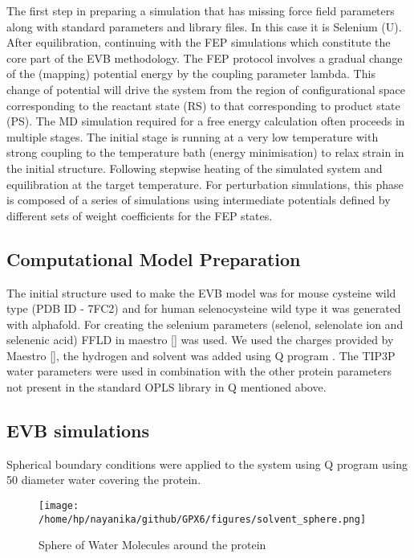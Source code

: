 \documentclass{article}
\begin{document}
The first step in preparing a simulation that has missing force field parameters along with standard parameters and library files. In this case it is Selenium (U). After equilibration, continuing with the FEP simulations which constitute the core part of the EVB methodology. The FEP protocol involves a gradual change of the (mapping) potential energy by the coupling parameter lambda. This change of potential will drive the system from the region of configurational space corresponding to the reactant state (RS) to that corresponding to product state (PS). The MD simulation required for a free energy calculation often proceeds in multiple stages. The initial stage is running at a very low temperature with strong coupling to the temperature bath (energy minimisation) to relax strain in the initial structure. Following stepwise heating of the simulated system and equilibration at the target temperature. For perturbation simulations, this phase is composed of a series of simulations using intermediate potentials defined by different sets of weight coefficients for the FEP states.

\subsection{Computational Model Preparation}

The initial structure used to make the EVB model was for mouse cysteine wild type (PDB ID - 7FC2) and for human selenocysteine wild type it was generated with alphafold. For creating the selenium parameters (selenol, selenolate ion and selenenic acid) FFLD in maestro [] was used. We used the charges provided by Maestro [], the hydrogen and solvent was added using Q program \cite{Marelius1999}. The TIP3P water parameters were used in combination with the other protein parameters not present in the standard OPLS library in Q mentioned above.

\subsection {EVB simulations}

Spherical boundary conditions \cite{King1989} were applied to the system using Q program \cite{Marelius1999} using 50 \text{\AA} diameter water covering the protein.

\begin{figure}
\begin{center}
\texttt{[image: /home/hp/nayanika/github/GPX6/figures/solvent\_sphere.png]} 
\end{center}
\caption{Sphere of Water Molecules around the protein}
\label{fig:figure1}
\end{figure}
\end{document}
